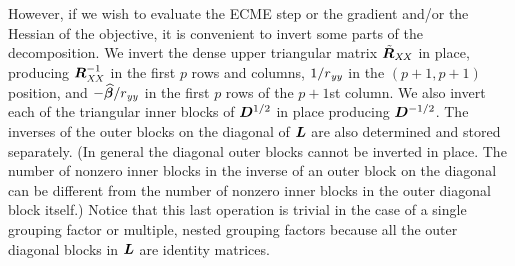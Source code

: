 \documentclass[12pt]{article}
\begin{document}
However, if we wish to evaluate the ECME step or the gradient and/or
the Hessian of the objective, it is convenient to invert some parts of
the decomposition.  We invert the dense upper triangular matrix
$\tilde{\bm{R}}_\mathit{XX}$ in place, producing $\bm{R}_\mathit{XX}^{-1}$ in the first $p$ rows and
columns, $1/r_\mathit{yy}$ in the $(p+1,p+1)$ position, and
$-\widehat{\bm{\beta}}/r_\mathit{yy}$ in the first $p$ rows of the $p+1$st column.
We also invert each of the triangular inner blocks of $\bm{D}^{1/2}$ in
place producing $\bm{D}^{-1/2}$.  The inverses of the outer blocks on the
diagonal of $\bm{L}$ are also determined and stored separately.  (In
general the diagonal outer blocks cannot be inverted in place.  The
number of nonzero inner blocks in the inverse of an outer block on the
diagonal can be different from the number of nonzero inner blocks in
the outer diagonal block itself.)  Notice that this last operation
is trivial in the case of a single grouping factor or multiple, nested
grouping factors because all the outer diagonal blocks in $\bm{L}$ are
identity matrices.
\end{document}
